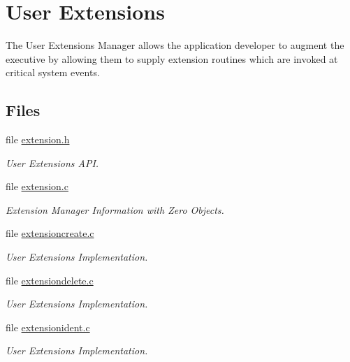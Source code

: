 \hypertarget{group__ClassicUserExtensions}{}\section{User Extensions}
\label{group__ClassicUserExtensions}


The User Extensions Manager allows the application developer to augment the executive by allowing them to supply extension routines which are invoked at critical system events.  


\subsection*{Files}
\begin{DoxyCompactItemize}
\item 
file \mbox{\hyperlink{extension_8h}{extension.\+h}}
\begin{DoxyCompactList}\small\item\em User Extensions A\+PI. \end{DoxyCompactList}\item 
file \mbox{\hyperlink{extension_8c}{extension.\+c}}
\begin{DoxyCompactList}\small\item\em Extension Manager Information with Zero Objects. \end{DoxyCompactList}\item 
file \mbox{\hyperlink{extensioncreate_8c}{extensioncreate.\+c}}
\begin{DoxyCompactList}\small\item\em User Extensions Implementation. \end{DoxyCompactList}\item 
file \mbox{\hyperlink{extensiondelete_8c}{extensiondelete.\+c}}
\begin{DoxyCompactList}\small\item\em User Extensions Implementation. \end{DoxyCompactList}\item 
file \mbox{\hyperlink{extensionident_8c}{extensionident.\+c}}
\begin{DoxyCompactList}\small\item\em User Extensions Implementation. \end{DoxyCompactList}\end{DoxyCompactItemize}
